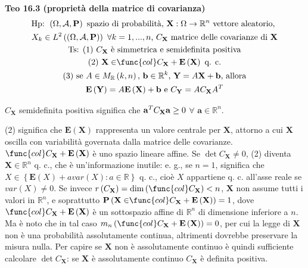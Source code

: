\documentclass{article}
\begin{document}
\textbf{Teo 16.3 (propriet\`{a} della matrice di covarianza)}%
\begin{gather*}
\text{Hp: }\left( \Omega ,\mathcal{A},\mathbf{P}\right) \text{ spazio di
probabilit\`{a}, }\mathbf{X}:\Omega \rightarrow 
\mathbb{R}
^{n}\text{ vettore aleatorio, } \\
X_{k}\in L^{2}\left( \left( \Omega ,\mathcal{A},\mathbf{P}\right) \right) 
\text{ }\forall k=1,...,n\text{, }C_{\mathbf{X}}\text{ matrice delle
covarianze di }\mathbf{X} \\
\text{Ts: (1) }C_{\mathbf{X}}\text{ \`{e} simmetrica e semidefinita positiva}
\\
\text{(2) }\mathbf{X\in }\func{col}C_{\mathbf{X}}+\mathbf{E}\left( \mathbf{X}%
\right) \text{ q. c.} \\
\text{(3) se }A\in M_{%
\mathbb{R}
}\left( k,n\right) \text{, }\mathbf{b}\in 
\mathbb{R}
^{k}\text{, }\mathbf{Y}=A\mathbf{X+b}\text{, allora} \\
\mathbf{E}\left( \mathbf{Y}\right) =A\mathbf{E}\left( \mathbf{X}\right) +%
\mathbf{b}\text{ e }C_{\mathbf{Y}}=AC_{\mathbf{X}}A^{T}
\end{gather*}

$C_{\mathbf{X}}$ semidefinita positiva significa che $\mathbf{a}^{T}C_{%
\mathbf{X}}\mathbf{a}\geq 0$ $\forall $ $\mathbf{a}\in 
\mathbb{R}
^{n}$.

(2) significa che $\mathbf{E}\left( \mathbf{X}\right) $ rappresenta un
valore centrale per $\mathbf{X}$, attorno a cui $\mathbf{X}$ oscilla con
variabilit\`{a} governata dalla matrice delle covarianze. $\func{col}C_{%
\mathbf{X}}+\mathbf{E}\left( \mathbf{X}\right) $ \`{e} uno spazio lineare
affine. Se $\det C_{\mathbf{X}}\neq 0$, (2) diventa $\mathbf{X}\in 
\mathbb{R}
^{n}$ q. c., che \`{e} un'informazione inutile: e. g., se $n=1$, significa
che $X\in \left\{ \mathbf{E}\left( X\right) +avar\left( X\right) :a\in 
\mathbb{R}
\right\} $ q. c., cio\`{e} $X$ appartiene q. c. all'asse reale se $var\left(
X\right) \neq 0$. Se invece $r\left( C_{\mathbf{X}}\right) =\dim \left( 
\func{col}C_{\mathbf{X}}\right) <n$, $\mathbf{X}$ non assume tutti i valori
in $%
\mathbb{R}
^{n}$, e soprattutto $\mathbf{P}\left( \mathbf{X\in }\func{col}C_{\mathbf{X}%
}+\mathbf{E}\left( \mathbf{X}\right) \right) =1$, dove $\func{col}C_{\mathbf{%
X}}+\mathbf{E}\left( \mathbf{X}\right) $ \`{e} un sottospazio affine di $%
\mathbb{R}
^{n}$ di dimensione inferiore a $n$. Ma \`{e} noto che in tal caso $%
m_{n}\left( \func{col}C_{\mathbf{X}}+\mathbf{E}\left( \mathbf{X}\right)
\right) =0$, per cui la legge di $\mathbf{X}$ non \`{e} una probabilit\`{a}
assolutamente continua, altrimenti dovrebbe preservare la misura nulla. Per
capire se $\mathbf{X}$ non \`{e} assolutamente continuo \`{e} quindi
sufficiente calcolare $\det C_{\mathbf{X}}$: se $\mathbf{X}$ \`{e}
assolutamente continuo $C_{\mathbf{X}}$ \`{e} definita positiva.
\end{document}
